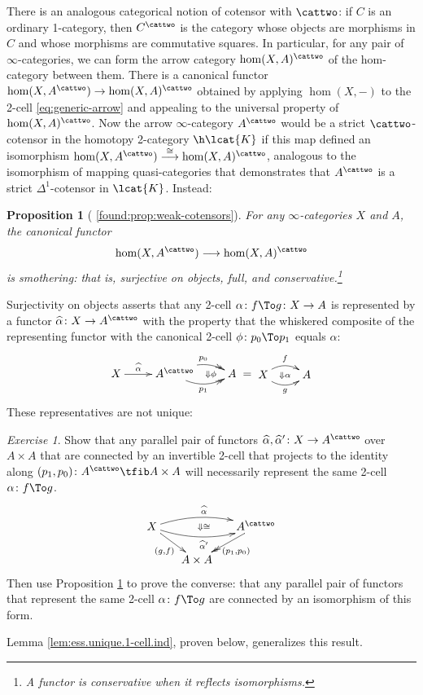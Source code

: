 \documentclass[12pt,reqno]{amsart}
\theoremstyle{plain}
\newtheorem{prop}[thm]{Proposition}
\theoremstyle{definition}
\theoremstyle{remark}
\newtheorem{exs}[thm]{Exercise}
\numberwithin{equation}{subsection}
\newcommand{\extRef}[3]{%
  {\protect\IfBeginWith{#3}{itm:}{}{#2.}}\ref*{#1:#3}}
\newcommand{\refI}{\extRef{found}{I}}
\begin{document}
There is an analogous categorical notion of cotensor with $\cattwo$: if $C$ is an ordinary 1-category, then $C^\cattwo$ is the category whose objects are morphisms in $C$ and whose morphisms are commutative squares. In particular, for any pair of $\infty$-categories, we can form the arrow category $\hom(X,A)^\cattwo$ of the hom-category between them. There is a canonical functor $\hom(X,A^\cattwo) \to \hom(X,A)^\cattwo$ obtained by applying $\hom(X,-)$ to the 2-cell \eqref{eq:generic-arrow} and appealing to the universal property of $\hom(X,A)^\cattwo$. Now the arrow $\infty$-category $A^\cattwo$ would be a strict $\cattwo$-cotensor in the homotopy 2-category $\h\lcat{K}$ if this map defined an isomorphism  $\hom(X,A^\cattwo) \stackrel{\cong}{\longrightarrow} \hom(X,A)^\cattwo$, analogous to the isomorphism of mapping quasi-categories that demonstrates that $A^\cattwo$ is a strict $\Delta^1$-cotensor in $\lcat{K}$. Instead: 

\begin{prop}[{\refI{prop:weak-cotensors}}]\label{prop:weak-cotensors} For any $\infty$-categories $X$ and $A$, the canonical functor
\[ \hom(X, A^\cattwo) \longrightarrow \hom(X,A)^{\cattwo}\] is \emph{smothering}: that is, surjective on objects, full, and conservative.\footnote{A functor is \emph{conservative} when it reflects isomorphisms.}
\end{prop}

Surjectivity on objects asserts that any 2-cell $\alpha \colon f \To g \colon X \to A$ is represented by a functor $\hat{\alpha} \colon X \to A^\cattwo$ with the property that the whiskered composite of the representing functor with the canonical 2-cell $\phi \colon p_0 \To p_1$ equals $\alpha$:
\[ \vcenter{\xymatrix{ X \ar[r]^-{\hat{\alpha}} & A^\cattwo \ar@{->>}@/^2ex/[r]^{p_0} \ar@{->>}@/_2ex/[r]_{p_1} \ar@{}[r]|-{\Downarrow\phi} & A}} = \vcenter{ \xymatrix{X \ar@/^2ex/[r]^f \ar@/_2ex/[r]_g \ar@{}[r]|{\Downarrow\alpha} & A}}\]
These representatives are not unique: 

\begin{exs} Show that any parallel pair of functors $\hat\alpha, \hat{\alpha}' \colon X \to A^\cattwo$ over $A \times A$ that are connected by an invertible 2-cell that projects to the identity along $(p_1,p_0) \colon A^\cattwo \tfib A \times A$ will necessarily represent the same 2-cell $\alpha \colon f \To g$.
\[ \xymatrix@=1.5em{ X \ar@/^2ex/[rr]^{\hat\alpha} \ar@/_2ex/[rr]_{{\hat\alpha}'} \ar@{}[rr]|{\Downarrow\cong} \ar[dr]_{(g,f)} & & A^\cattwo \ar@{->>}[dl]^{(p_1,p_0)} \\ & A \times A}\] Then use Proposition \ref{prop:weak-cotensors} to prove the converse: that any parallel pair of functors that represent the same 2-cell $\alpha \colon f \To g$ are connected by an isomorphism of this form. 

Lemma \ref{lem:ess.unique.1-cell.ind}, proven below, generalizes this result.
\end{exs}
\end{document}
